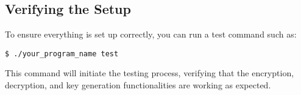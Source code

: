 \subsection{Verifying the Setup}
To ensure everything is set up correctly, you can run a test command such as:
\begin{verbatim}
$ ./your_program_name test
\end{verbatim}
This command will initiate the testing process, verifying that the encryption, decryption, and key generation functionalities are working as expected.
